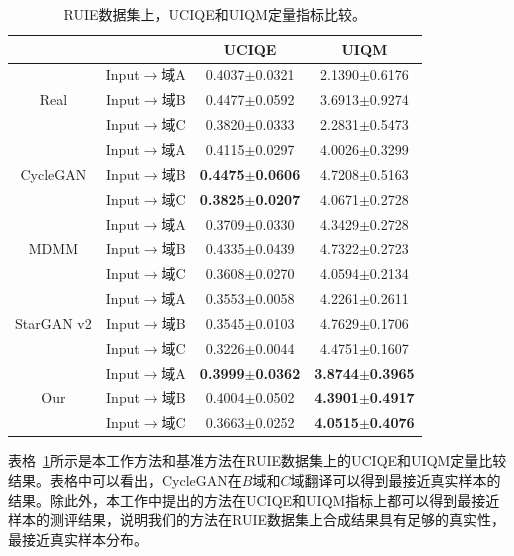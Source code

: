\begin{table}[htp]
  \centering
  \caption{RUIE数据集上，UCIQE和UIQM定量指标比较。}
    \begin{tabular}{c|c|cc}
    \toprule
    \multicolumn{2}{c|}{} & \multicolumn{1}{c}{UCIQE} & UIQM \\
    \midrule
    \multirow{3}[2]{*}{Real} & Input$\rightarrow$域A & 0.4037$\pm$0.0321 & 2.1390$\pm$0.6176 \\
                             & Input$\rightarrow$域B & 0.4477$\pm$0.0592 & 3.6913$\pm$0.9274 \\
                             & Input$\rightarrow$域C & 0.3820$\pm$0.0333 & 2.2831$\pm$0.5473 \\
    \midrule
    \multirow{3}[2]{*}{CycleGAN} & Input$\rightarrow$域A & 0.4115$\pm$0.0297& 4.0026$\pm$0.3299 \\
                                 & Input$\rightarrow$域B & \textbf{0.4475$\pm$0.0606} &4.7208$\pm$0.5163 \\
                                 & Input$\rightarrow$域C & \textbf{0.3825$\pm$0.0207} &4.0671$\pm$0.2728  \\
    \midrule
    \multirow{3}[2]{*}{MDMM} & Input$\rightarrow$域A & 0.3709$\pm$0.0330 & 4.3429$\pm$0.2728 \\
          & Input$\rightarrow$域B & 0.4335$\pm$0.0439 & 4.7322$\pm$0.2723 \\
          & Input$\rightarrow$域C & 0.3608$\pm$0.0270 & 4.0594$\pm$0.2134 \\
    \midrule
    \multirow{3}[2]{*}{StarGAN v2} &Input$\rightarrow$域A & 0.3553$\pm$0.0058 & 4.2261$\pm$0.2611 \\
          & Input$\rightarrow$域B & 0.3545$\pm$0.0103 & 4.7629$\pm$0.1706 \\
          & Input$\rightarrow$域C & 0.3226$\pm$0.0044 & 4.4751$\pm$0.1607 \\
    \midrule
    \multirow{3}[2]{*}{Our} & Input$\rightarrow$域A & \textbf{0.3999$\pm$0.0362} & \textbf{3.8744$\pm$0.3965} \\
          & Input$\rightarrow$域B & 0.4004$\pm$0.0502 & \textbf{4.3901$\pm$0.4917} \\
          & Input$\rightarrow$域C & 0.3663$\pm$0.0252 & \textbf{4.0515$\pm$0.4076} \\
    \bottomrule
    \end{tabular}%
  \label{tab:underwater_matric_ruie}%
\end{table}%

表格~\ref{tab:underwater_matric_ruie}所示是本工作方法和基准方法在RUIE数据集上的UCIQE和UIQM定量比较结果。表格中可以看出，CycleGAN在$B$域和$C$域翻译可以得到最接近真实样本的结果。除此外，本工作中提出的方法在UCIQE和UIQM指标上都可以得到最接近样本的测评结果，说明我们的方法在RUIE数据集上合成结果具有足够的真实性，最接近真实样本分布。

